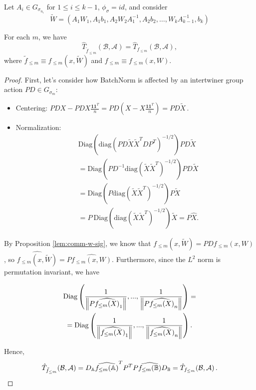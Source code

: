 \documentclass[../main.tex]{subfiles}
\begin{document}
\begin{proposition}
\label{prop:rob_rel}
Let $A_i \in G_{\sigma_{n_i}}$ for $1 \leq i \leq k-1$, $\phi_{\sigma}=id$, and consider 
  \begin{equation*}
  \widetilde{W}  = (A_1 W_1, A_1b_1, A_2 W_2 A_1^{-1}, A_2 b_2 , \dots,
  W_{k}A_{k-1}^{-1}, b_{k})
  \end{equation*}

For each $m$, we have
\[
\hat{T}_{\tilde{f}_{\leq m}}(\mathcal{B}, \mathcal{A}) = \hat{T}_{f_{\leq m}}(\mathcal{B}, \mathcal{A}),
\]
where $\tilde{f}_{\leq m}\equiv f_{\leq m}(x, \widetilde{W})$ and $f_{\leq m}\equiv f_{\leq m}(x, W)$.
\end{proposition}
\begin{proof}
First, let's consider how BatchNorm is affected by an intertwiner group action $PD \in G_{\sigma_m}$:
\begin{itemize}
    \item Centering: $
    PDX-PDX \frac{\mathbf{1}\mathbf{1}^T}{n} = PD\left( X-X \frac{\mathbf{1}\mathbf{1}^T}{n} \right) = PD \tilde{X}\,.$
    \item Normalization:
    \begin{align*}
        &\text{Diag}\left(\text{diag}(PD \tilde{X} \tilde{X}^T D P^T)^{-1/2}\right)PD \tilde{X} \\
        &= \text{Diag}(PD^{-1}\text{diag}(\tilde{X} \tilde{X}^T)^{-1/2})PD \tilde{X}\\
        &= \text{Diag}(P\text{diag}(\tilde{X} \tilde{X}^T)^{-1/2})P \tilde{X}\\
        &= P\ \text{Diag}(\text{diag}(\tilde{X} \tilde{X}^T)^{-1/2})\tilde{X} = P \hat{X}.
    \end{align*}
\end{itemize}

By Proposition \ref{lem:comm-w-sig}, we know that $ f_{\leq m}(x, \widetilde{W}) = PD f_{\leq m}(x, W)$, so $\widehat{f_{\leq m}(x, \widetilde{W})}= P \widehat{f_{\leq m}(x, W)}$. Furthermore, since the $L^2$ norm is permutation invariant, we have

\begin{gather*}
\text{Diag}\left(\frac{1}{\left\lVert P\widehat{f_{\leq m}(X)}_{1} \right\rVert}, ..., \frac{1}{\left\lVert P\widehat{f_{\leq m}(X)}_{n} \right\rVert} \right) =\\
=\text{Diag}\left(\frac{1}{\left\lVert \widehat{f_{\leq m}(X)}_{1} \right\rVert}, ..., \frac{1}{\left\lVert \widehat{f_{\leq m}(X)}_{n} \right\rVert} \right).
\end{gather*}

Hence, 
\[
\hat{T}_{\tilde{f}_{\leq m}}(\mathcal{B}, \mathcal{A}) =
D_{\mathbb{A}} \widehat{f_{\leq m}(\mathbb{A})}^T P^T P \widehat{f_{\leq m}(\mathbb{B})} D_{\mathbb{B}}=
\hat{T}_{f_{\leq m}}(\mathcal{B}, \mathcal{A})\,.
\]
\end{proof}
\end{document}
